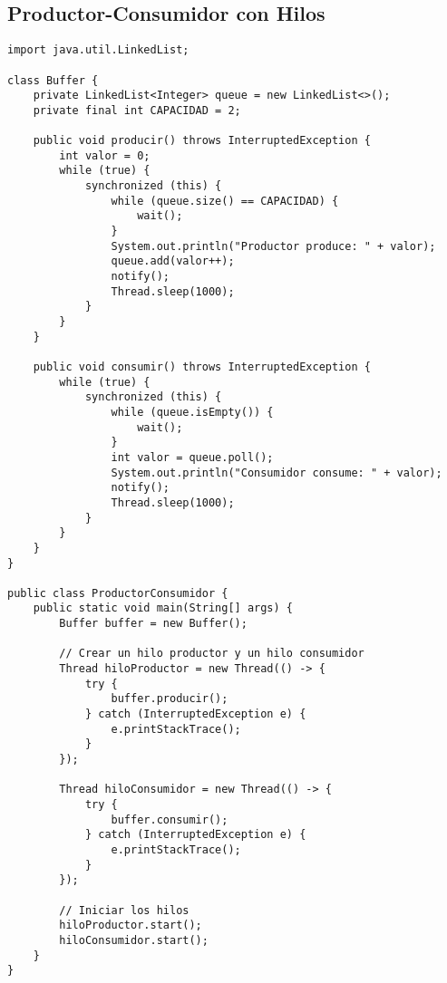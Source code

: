 \documentclass{article}
\begin{document}
\subsection{Productor-Consumidor con Hilos}
\begin{verbatim}
import java.util.LinkedList;

class Buffer {
    private LinkedList<Integer> queue = new LinkedList<>();
    private final int CAPACIDAD = 2;

    public void producir() throws InterruptedException {
        int valor = 0;
        while (true) {
            synchronized (this) {
                while (queue.size() == CAPACIDAD) {
                    wait();
                }
                System.out.println("Productor produce: " + valor);
                queue.add(valor++);
                notify();
                Thread.sleep(1000);
            }
        }
    }

    public void consumir() throws InterruptedException {
        while (true) {
            synchronized (this) {
                while (queue.isEmpty()) {
                    wait();
                }
                int valor = queue.poll();
                System.out.println("Consumidor consume: " + valor);
                notify();
                Thread.sleep(1000);
            }
        }
    }
}

public class ProductorConsumidor {
    public static void main(String[] args) {
        Buffer buffer = new Buffer();

        // Crear un hilo productor y un hilo consumidor
        Thread hiloProductor = new Thread(() -> {
            try {
                buffer.producir();
            } catch (InterruptedException e) {
                e.printStackTrace();
            }
        });

        Thread hiloConsumidor = new Thread(() -> {
            try {
                buffer.consumir();
            } catch (InterruptedException e) {
                e.printStackTrace();
            }
        });

        // Iniciar los hilos
        hiloProductor.start();
        hiloConsumidor.start();
    }
}
\end{verbatim}
\end{document}
